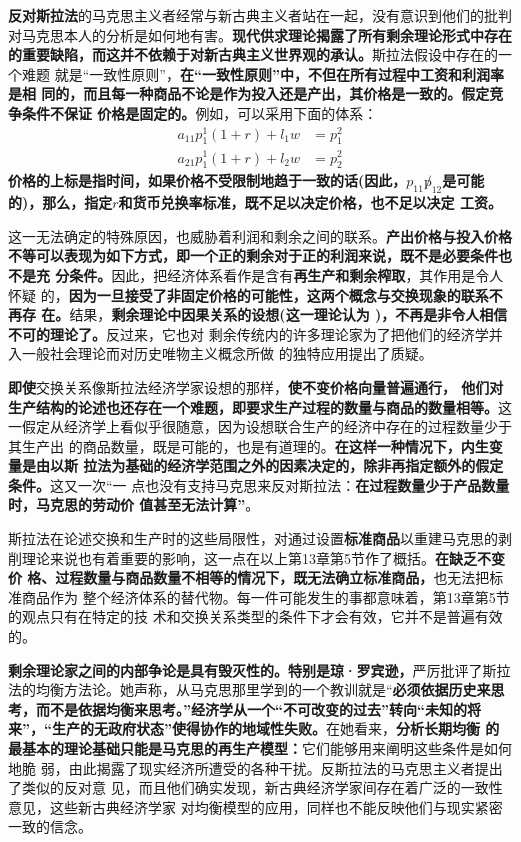 \textbf{反对斯拉法}的马克思主义者经常与新古典主义者站在一起，没有意识到他们的批判
对马克思本人的分析是如何地有害。\textbf{现代供求理论揭露了所有剩余理论形式中存在
  的重要缺陷，而这并不依赖于对新古典主义世界观的承认。}斯拉法假设中存在的一个难题
就是“一致性原则”，\textbf{在“一致性原则”中，不但在所有过程中工资和利润率是相
  同的，而且每一种商品不论是作为投入还是产出，其价格是一致的。假定竞争条件不保证
  价格是固定的。}例如，可以采用下面的体系：
\begin{align*}
  a_{11}p_1^1(1+r) + l_1w  &= p_1^2 \\
  a_{21}p_1^1(1+r)  +l_2w &= p_2^2
\end{align*}
\textbf{价格的上标是指时间，如果价格不受限制地趋于一致的话(因此，$p_{11} \not
  p_{12}$是可能的)，那么，指定$r$和货币兑换率标准，既不足以决定价格，也不足以决定
  工资。}

这一无法确定的特殊原因，也威胁着利润和剩余之间的联系。\textbf{产出价格与投入价格
  不等可以表现为如下方式，即一个正的剩余对于正的利润来说，既不是必要条件也不是充
  分条件。}因此，把经济体系看作是含有\textbf{再生产和剩余榨取}，其作用是令人怀疑
的，\textbf{因为一旦接受了非固定价格的可能性，这两个概念与交换现象的联系不再存
  在。}结果，\textbf{剩余理论中因果关系的设想(这一理论认为 )，不再是非令人相信不可的理论了。}反过来，它也对
剩余传统内的许多理论家为了把他们的经济学并入一般社会理论而对历史唯物主义概念所做
的独特应用提出了质疑。

\textbf{即使}交换关系像斯拉法经济学家设想的那样，\textbf{使不变价格向量普遍通行，
  他们对生产结构的论述也还存在一个难题，即要求生产过程的数量与商品的数量相等。}这
一假定从经济学上看似乎很随意，因为设想联合生产的经济中存在的过程数量少于其生产出
的商品数量，既是可能的，也是有道理的。\textbf{在这样一种情况下，内生变量是由以斯
  拉法为基础的经济学范围之外的因素决定的，除非再指定额外的假定条件。}这又一次“一
点也没有支持马克思来反对斯拉法：\textbf{在过程数量少于产品数量时，马克思的劳动价
  值甚至无法计算”}。

斯拉法在论述交换和生产时的这些局限性，对通过设置\textbf{标准商品}以重建马克思的剥
削理论来说也有着重要的影响，这一点在以上第13章第5节作了概括。\textbf{在缺乏不变价
  格、过程数量与商品数量不相等的情况下，既无法确立标准商品，}也无法把标准商品作为
整个经济体系的替代物。每一件可能发生的事都意味着，第13章第5节的观点只有在特定的技
术和交换关系类型的条件下才会有效，它并不是普遍有效的。

\textbf{剩余理论家之间的内部争论是具有毁灭性的。特别是琼·罗宾逊，}严厉批评了斯拉
法的均衡方法论。她声称，从马克思那里学到的一个教训就是“\textbf{必须依据历史来思
  考，而不是依据均衡来思考。”经济学从一个“不可改变的过去”转向“未知的将
  来”，“生产的无政府状态”使得协作的地域性失败。}在她看来，\textbf{分析长期均衡
  的最基本的理论基础只能是马克思的再生产模型：}它们能够用来阐明这些条件是如何地脆
弱，由此揭露了现实经济所遭受的各种干扰。反斯拉法的马克思主义者提出了类似的反对意
见，而且他们确实发现，新古典经济学家间存在着广泛的一致性意见，这些新古典经济学家
对均衡模型的应用，同样也不能反映他们与现实紧密一致的信念。

